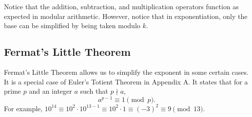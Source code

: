 \documentclass{article}
\newcommand{\Z}{\mathbb{Z}}
\newcommand{\p}{\varphi}
\begin{document}
Notice that the addition, subtraction, and multiplication operators function as expected in modular arithmetic. However, notice that in exponentiation, only the base can be simplified by being taken modulo $k$.
\subsection{Fermat's Little Theorem}
Fermat's Little Theorem allows us to simplify the exponent in some certain cases. It is a special case of Euler's Totient Theorem in Appendix A. It states that for a prime $p$ and an integer $a$ such that $p \nmid a$, \[a^{p-1} \equiv 1 \pmod p.\]
For example, $10^{14} \equiv 10^2\cdot10^{13-1}\equiv 10^2\cdot 1 \equiv (-3)^2 \equiv 9\pmod{13}$.
\newpage

\end{document}
